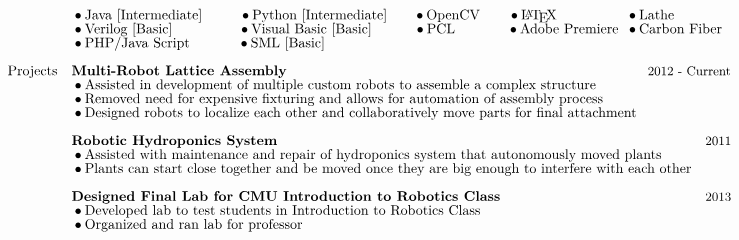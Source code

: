 \documentclass[]{article}
\newcommand{\subpoint}[1]{\bullet \text{\fontsize{10pt}{12pt}\selectfont #1}}
\newcommand{\Date}[1]{ \text{\fontsize{9pt}{12pt}\selectfont #1}}
\begin{document}
\begin{align*}
& && \subpoint{Java [Intermediate]}
 \hspace{.925cm}  \subpoint{Python [Intermediate]} \hspace{.655cm} \subpoint{OpenCV}
 \hspace{.7 cm} \subpoint{\LaTeX}
 && \hspace{-2cm} \subpoint{Lathe}\\[-.5em]
& && \subpoint{Verilog [Basic]} \hspace{1.65cm} \subpoint{Visual Basic [Basic]} 
\hspace{1.05cm} \subpoint{PCL}
\hspace{1.3cm} \subpoint{Adobe Premiere}
&&\hspace{-2cm} \subpoint{Carbon Fiber}\\[-.5em]
& && \subpoint{PHP/Java Script}  \hspace{1.2cm} \subpoint{SML [Basic]}
\hspace{1.5cm} \\[.5em]
%
%
%
& \text{Projects} &&\textbf{Multi-Robot Lattice Assembly} && 
\hspace{-1.45cm} \Date{2012 - Current} \\[-.5em]
& && \subpoint{ Assisted in development of  multiple custom robots to assemble a complex structure}\\[-.5em]
& && \subpoint{ Removed need for expensive fixturing and allows for automation of assembly process}\\[-.5em]
& && \subpoint{ Designed robots to localize each other and collaboratively move parts for final attachment }\\[.5em]
& &&\textbf{Robotic Hydroponics System} &&  \hspace{0cm} \Date{2011}\\[-.5em]
& &&\subpoint{Assisted with maintenance and repair of hydroponics system that autonomously moved plants}\\[-.5em]
& && \subpoint{Plants can start close together and be moved once they are big enough to interfere with each other}\\[.5em]
& && \textbf{Designed Final Lab for CMU Introduction to Robotics Class} && \hspace{0cm} \Date{2013}\\[-.5em]
& && \subpoint{Developed lab to test students in Introduction to Robotics Class}\\[-.5em]
& && \subpoint{Organized and ran lab for professor}\\[-.5em]

\end{align*}
\end{document}
